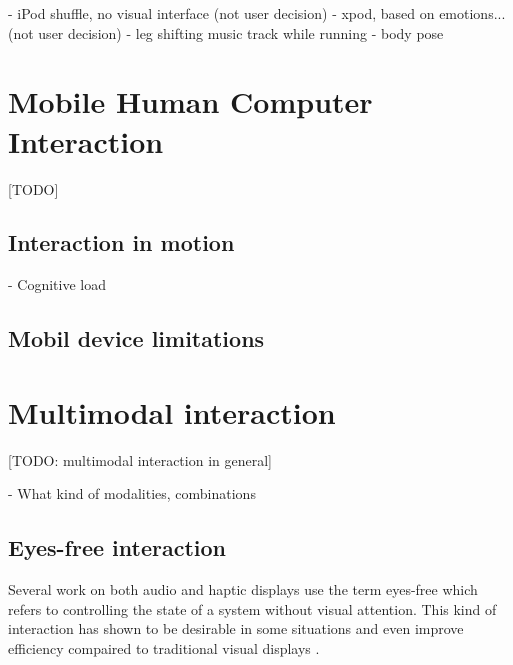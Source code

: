 - iPod shuffle, no visual interface (not user decision)
- xpod, based on emotions... (not user decision)
- leg shifting music track while running \cite{smus_running_2010}
- body pose


\section{Mobile Human Computer Interaction}
[TODO]

\subsection{Interaction in motion}

- Cognitive load

\subsection{Mobil device limitations}


\section{Multimodal interaction}
[TODO: multimodal interaction in general]

- What kind of modalities, combinations


\subsection{Eyes-free interaction}
Several work on both audio \cite{kajastila_eyes-free_2013,bonner_no-look_2010,brewster_multimodaleyes-freeinteraction_2003,zhao_earpod:_2007,vazquez-alvarez_eyes-free_2011} and haptic \cite{pasquero_haptic_2011,pielot_tactile_2011} displays use the term eyes-free which refers to controlling the state of a system without visual attention. This kind of interaction has shown to be desirable in some situations \cite{oakley_designing_2007,yi_exploring_2012} and even improve efficiency compaired to traditional visual displays \cite{zhao_earpod:_2007}.

